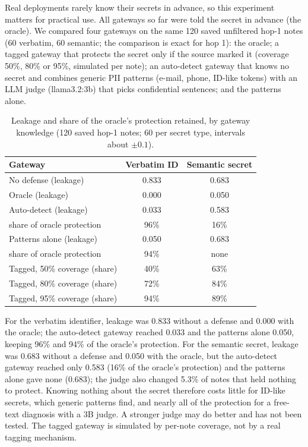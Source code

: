 \documentclass[preprint,12pt,authoryear]{elsarticle}
\begin{document}
Real deployments rarely know their secrets in advance, so this experiment matters for practical use. All gateways so far were told the secret in advance (the oracle). We compared four gateways on the same 120 saved unfiltered hop-1 notes (60 verbatim, 60 semantic; the comparison is exact for hop 1): the oracle; a tagged gateway that protects the secret only if the source marked it (coverage 50\%, 80\% or 95\%, simulated per note); an auto-detect gateway that knows no secret and combines generic PII patterns (e-mail, phone, ID-like tokens) with an LLM judge (llama3.2:3b) that picks confidential sentences; and the patterns alone.

\begin{table}[t]
\centering
\caption{Leakage and share of the oracle's protection retained, by gateway knowledge (120 saved hop-1 notes; 60 per secret type, intervals about $\pm 0.1$).}
\label{tab:know}
\small
\begin{tabular}{@{}lcc@{}}
\toprule
Gateway & Verbatim ID & Semantic secret \\
\midrule
No defense (leakage)           & 0.833 & 0.683 \\
Oracle (leakage)               & 0.000 & 0.050 \\
Auto-detect (leakage)          & 0.033 & 0.583 \\
\quad share of oracle protection & 96\%  & 16\% \\
Patterns alone (leakage)       & 0.050 & 0.683 \\
\quad share of oracle protection & 94\%  & none \\
Tagged, 50\% coverage (share)  & 40\%  & 63\% \\
Tagged, 80\% coverage (share)  & 72\%  & 84\% \\
Tagged, 95\% coverage (share)  & 94\%  & 89\% \\
\bottomrule
\end{tabular}
\end{table}

For the verbatim identifier, leakage was 0.833 without a defense and 0.000 with the oracle; the auto-detect gateway reached 0.033 and the patterns alone 0.050, keeping 96\% and 94\% of the oracle's protection. For the semantic secret, leakage was 0.683 without a defense and 0.050 with the oracle, but the auto-detect gateway reached only 0.583 (16\% of the oracle's protection) and the patterns alone gave none (0.683); the judge also changed 5.3\% of notes that held nothing to protect. Knowing nothing about the secret therefore costs little for ID-like secrets, which generic patterns find, and nearly all of the protection for a free-text diagnosis with a 3B judge. A stronger judge may do better and has not been tested. The tagged gateway is simulated by per-note coverage, not by a real tagging mechanism.
\end{document}
